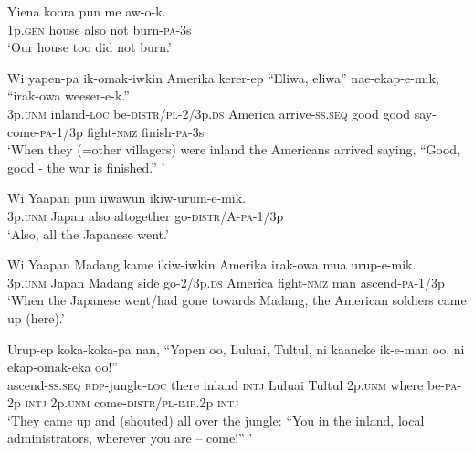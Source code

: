 \ea\label{ex:a:x93}
\gll  Yiena  koora  pun  me  aw-o-k. \\
1p.\textsc{gen}  house  also  not  burn-\textsc{pa}-3s \\
\glt ‘Our house too did not burn.’ \\
\z


\ea\label{ex:a:x94}
\gll  Wi  yapen-pa  ik-omak-iwkin  Amerika  kerer-ep             “Eliwa,  eliwa”  nae-ekap-e-mik,  “irak-owa  weeser-e-k.” \\
3p.\textsc{unm}  inland-\textsc{loc}  be-\textsc{distr}/\textsc{pl}-2/3p.\textsc{ds}  America  arrive-\textsc{ss.seq}  good  good  say-come-\textsc{pa}-1/3p  fight-\textsc{nmz}  finish-\textsc{pa}-3s \\
\glt ‘When they (=other villagers) were inland the Americans arrived saying, “Good, good - the war is finished.” ’ \\
\z


\ea\label{ex:a:x95}
\gll  Wi  Yaapan  pun  iiwawun  ikiw-urum-e-mik. \\
3p.\textsc{unm}  Japan  also  altogether  go-\textsc{distr}/A-\textsc{pa}-1/3p \\
\glt ‘Also, all the Japanese went.’ \\
\z


\ea\label{ex:a:x96}
\gll  Wi  Yaapan  Madang  kame  ikiw-iwkin  Amerika  irak-owa mua  urup-e-mik. \\
3p.\textsc{unm}  Japan  Madang  side  go-2/3p.\textsc{ds}  America  fight-\textsc{nmz}   man  ascend-\textsc{pa}-1/3p \\


\glt ‘When the Japanese went/had gone towards Madang, the American soldiers came up (here).’ \\
\z


\ea\label{ex:a:x97}
\gll  Urup-ep  koka-koka-pa  nan,  “Yapen  oo,  Luluai,  Tultul,   ni  kaaneke  ik-e-man  oo,  ni  ekap-omak-eka               oo!” \\
ascend-\textsc{ss.seq}  \textsc{rdp}-jungle-\textsc{loc}  there  inland  \textsc{intj}  Luluai  Tultul 2p.\textsc{unm}  where  be-\textsc{pa}-2p  \textsc{intj}  2p.\textsc{unm}  come-\textsc{distr}/\textsc{pl}-\textsc{imp}.2p \textsc{intj} \\




\glt ‘They came up and (shouted) all over the jungle: “You in the inland, local administrators, wherever you are – come!” ’ \\
\z


